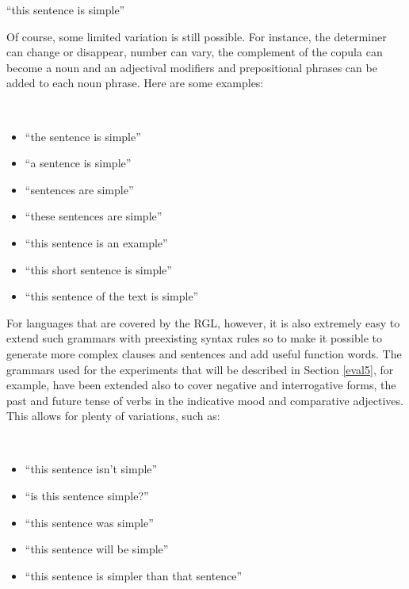 \begin{example}
    ``this sentence is simple''
\end{example}

Of course, some limited variation is still possible. 
For instance, the determiner can change or disappear, number can vary, the complement of the copula can become a noun and an adjectival modifiers and prepositional phrases can be added to each noun phrase. 
Here are some examples:

\begin{example} \ \smallskip
    \begin{itemize}
        \item ``the sentence is simple''
        \item ``a sentence is simple''
        \item ``sentences are simple''
        \item ``these sentences are simple''
        \item ``this sentence is an example''
        \item ``this short sentence is simple''
        \item ``this sentence of the text is simple''
    \end{itemize}
\end{example}

For languages that are covered by the RGL, however, it is also extremely easy to extend such grammars with preexisting syntax rules so to make it possible to generate more complex clauses and sentences and add useful function words.
The grammars used for the experiments that will be described in Section \ref{eval5}, for example, have been extended also to cover negative and interrogative forms, the past and future tense of verbs in the indicative mood and comparative adjectives. 
This allows for plenty of variations, such as:

\begin{example} \ \smallskip
    \begin{itemize}
        \item ``this sentence isn't simple''
        \item ``is this sentence simple?''
        \item ``this sentence was simple''
        \item ``this sentence will be simple''
        \item ``this sentence is simpler than that sentence''
    \end{itemize}
\end{example}

